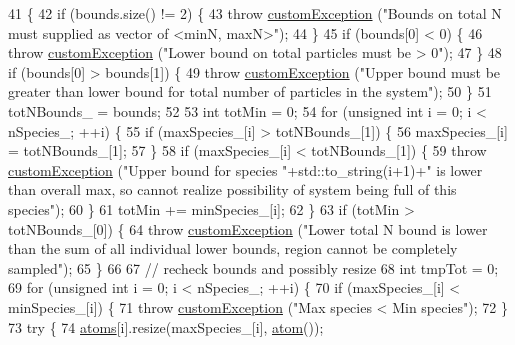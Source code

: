\begin{DoxyCode}
41                                                               \{
42     \textcolor{keywordflow}{if} (bounds.size() != 2) \{
43         \textcolor{keywordflow}{throw} \hyperlink{classcustom_exception}{customException} (\textcolor{stringliteral}{"Bounds on total N must supplied as vector of <minN, maxN>"});
44     \}
45     \textcolor{keywordflow}{if} (bounds[0] < 0) \{
46         \textcolor{keywordflow}{throw} \hyperlink{classcustom_exception}{customException} (\textcolor{stringliteral}{"Lower bound on total particles must be > 0"});
47     \}
48     \textcolor{keywordflow}{if} (bounds[0] > bounds[1]) \{
49         \textcolor{keywordflow}{throw} \hyperlink{classcustom_exception}{customException} (\textcolor{stringliteral}{"Upper bound must be greater than lower bound for total
       number of particles in the system"});
50     \}
51     totNBounds\_ = bounds;
52 
53     \textcolor{keywordtype}{int} totMin = 0;
54     \textcolor{keywordflow}{for} (\textcolor{keywordtype}{unsigned} \textcolor{keywordtype}{int} i = 0; i < nSpecies\_; ++i) \{
55         \textcolor{keywordflow}{if} (maxSpecies\_[i] > totNBounds\_[1]) \{
56             maxSpecies\_[i] = totNBounds\_[1];
57         \}
58         \textcolor{keywordflow}{if} (maxSpecies\_[i] < totNBounds\_[1]) \{
59             \textcolor{keywordflow}{throw} \hyperlink{classcustom_exception}{customException} (\textcolor{stringliteral}{"Upper bound for species "}+std::to\_string(i+1)+\textcolor{stringliteral}{" is lower
       than overall max, so cannot realize possibility of system being full of this species"});
60         \}
61         totMin += minSpecies\_[i];
62     \}
63     \textcolor{keywordflow}{if} (totMin > totNBounds\_[0]) \{
64         \textcolor{keywordflow}{throw} \hyperlink{classcustom_exception}{customException} (\textcolor{stringliteral}{"Lower total N bound is lower than the sum of all individual
       lower bounds, region cannot be completely sampled"});
65     \}
66 
67     \textcolor{comment}{// recheck bounds and possibly resize}
68     \textcolor{keywordtype}{int} tmpTot = 0;
69     \textcolor{keywordflow}{for} (\textcolor{keywordtype}{unsigned} \textcolor{keywordtype}{int} i = 0; i < nSpecies\_; ++i) \{
70         \textcolor{keywordflow}{if} (maxSpecies\_[i] < minSpecies\_[i]) \{
71             \textcolor{keywordflow}{throw} \hyperlink{classcustom_exception}{customException} (\textcolor{stringliteral}{"Max species < Min species"});
72         \}
73         \textcolor{keywordflow}{try} \{
74             \hyperlink{classsim_system_a90421b19082f7fb8fc23b7264b1161e4}{atoms}[i].resize(maxSpecies\_[i], \hyperlink{classatom}{atom}());

\end{DoxyCode}
